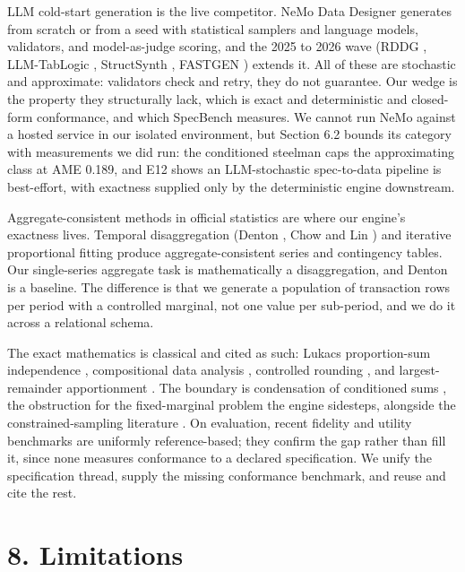 LLM cold-start generation is the live competitor. NeMo Data Designer
\cite{nemo_data_designer} generates from scratch or from a seed with
statistical samplers and language models, validators, and model-as-judge
scoring, and the 2025 to 2026 wave (RDDG \cite{rddg2026}, LLM-TabLogic
\cite{llmtablogic2026}, StructSynth \cite{structsynth2025}, FASTGEN
\cite{fastgen2025}) extends it. All of these are stochastic and
approximate: validators check and retry, they do not guarantee. Our
wedge is the property they structurally lack, which is exact and
deterministic and closed-form conformance, and which SpecBench measures.
We cannot run NeMo against a hosted service in our isolated environment,
but Section 6.2 bounds its category with measurements we did run: the
conditioned steelman caps the approximating class at AME 0.189, and E12
shows an LLM-stochastic spec-to-data pipeline is best-effort, with
exactness supplied only by the deterministic engine downstream.

Aggregate-consistent methods in official statistics are where our
engine's exactness lives. Temporal disaggregation (Denton
\cite{denton1971}, Chow and Lin \cite{chowlin1971}) and iterative
proportional fitting \cite{deming1940ipf} produce aggregate-consistent
series and contingency tables. Our single-series aggregate task is
mathematically a disaggregation, and Denton is a baseline. The
difference is that we generate a population of transaction rows per
period with a controlled marginal, not one value per sub-period, and we
do it across a relational schema.

The exact mathematics is classical and cited as such: Lukacs
proportion-sum independence \cite{lukacs1955gamma}, compositional data
analysis \cite{aitchison1986compositional}, controlled rounding
\cite{cox1987rounding}, and largest-remainder apportionment
\cite{balinski1982fair}. The boundary is condensation of conditioned
sums \cite{armendariz2011condensation,szavits2014condensation}, the
obstruction for the fixed-marginal problem the engine sidesteps,
alongside the constrained-sampling literature \cite{golchi2016scmc}. On
evaluation, recent fidelity and utility benchmarks
\cite{multidim_benchmark2025,syntheval2024,tabsyndex2022} are uniformly
reference-based; they confirm the gap rather than fill it, since none
measures conformance to a declared specification. We unify the
specification thread, supply the missing conformance benchmark, and
reuse and cite the rest.

\hypertarget{limitations}{%
\section{8. Limitations}\label{limitations}}

